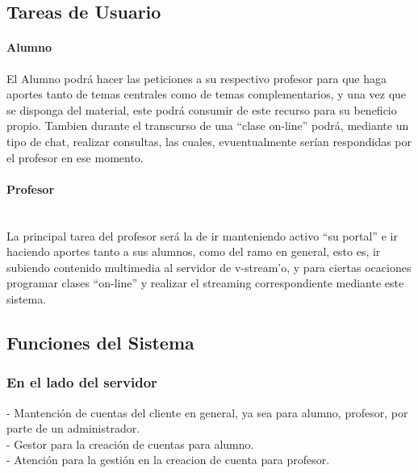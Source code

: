 \documentclass[12pt]{article}
\begin{document}
\newpage
\subsection{Tareas de Usuario}
\paragraph{Alumno\\}

El Alumno podrá hacer las peticiones a su respectivo profesor para que haga aportes tanto de temas 
centrales como de temas complementarios, y una vez que se disponga del material, este podrá consumir
de este recurso para su beneficio propio. Tambien durante el transcurso de una ``clase on-line'' podrá,
mediante un tipo de chat, realizar consultas, las cuales, evuentualmente serían respondidas por el profesor en ese momento.\\

\paragraph{Profesor\\\\}

La principal tarea del profesor será la de ir manteniendo activo ``su portal'' e ir haciendo aportes
tanto a sus alumnos, como del ramo en general, esto es, ir subiendo contenido multimedia al servidor de 
v-stream'o, y para ciertas ocaciones programar clases ``on-line'' y realizar el streaming correspondiente
mediante este sistema.\\

\subsection{Funciones del Sistema}

\subsubsection{En el lado del servidor}

-	Mantención de cuentas del cliente en general, ya sea para alumno, profesor, por parte de un administrador.\\

-	Gestor para la creación de cuentas para alumno.\\

- 	Atención para la gestión en la creacion de cuenta para profesor.\\
\end{document}
